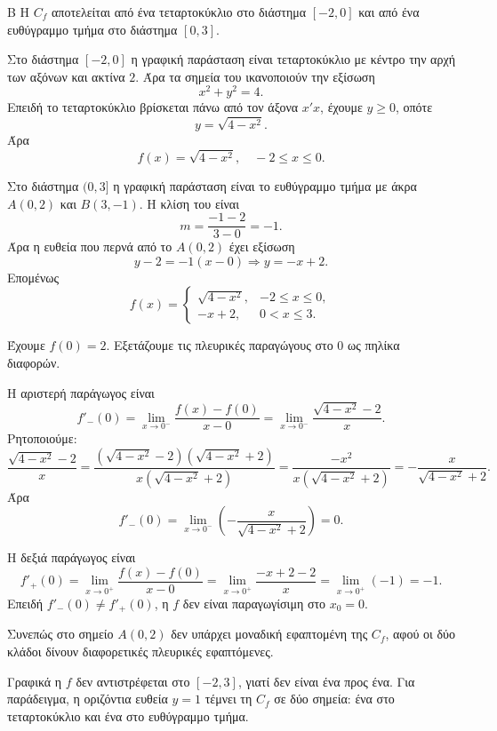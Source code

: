 

\begin{thema}{Β}
Η $C_f$ αποτελείται από ένα τεταρτοκύκλιο στο διάστημα $[-2,0]$ και από ένα ευθύγραμμο τμήμα στο διάστημα $[0,3]$.

\begin{erwthma}
\item Στο διάστημα $[-2,0]$ η γραφική παράσταση είναι τεταρτοκύκλιο με κέντρο την αρχή των αξόνων και ακτίνα $2$. Άρα τα σημεία του ικανοποιούν την εξίσωση
\[
x^2+y^2=4.
\]
Επειδή το τεταρτοκύκλιο βρίσκεται πάνω από τον άξονα $x'x$, έχουμε $y\geq 0$, οπότε
\[
y=\sqrt{4-x^2}.
\]
Άρα
\[
f(x)=\sqrt{4-x^2},\quad -2\leq x\leq 0.
\]

Στο διάστημα $(0,3]$ η γραφική παράσταση είναι το ευθύγραμμο τμήμα με άκρα $A(0,2)$ και $B(3,-1)$. Η κλίση του είναι
\[
m=\frac{-1-2}{3-0}=-1.
\]
Άρα η ευθεία που περνά από το $A(0,2)$ έχει εξίσωση
\[
y-2=-1(x-0)\Rightarrow y=-x+2.
\]
Επομένως
\[
f(x)=
\begin{cases}
\sqrt{4-x^2}, & -2\leq x\leq 0,\\
-x+2, & 0<x\leq 3.
\end{cases}
\]

\item Έχουμε $f(0)=2$. Εξετάζουμε τις πλευρικές παραγώγους στο $0$ ως πηλίκα διαφορών.

Η αριστερή παράγωγος είναι
\[
f'_-(0)=\lim_{x\to 0^-}\frac{f(x)-f(0)}{x-0}
=\lim_{x\to 0^-}\frac{\sqrt{4-x^2}-2}{x}.
\]
Ρητοποιούμε:
\[
\frac{\sqrt{4-x^2}-2}{x}
=\frac{(\sqrt{4-x^2}-2)(\sqrt{4-x^2}+2)}{x(\sqrt{4-x^2}+2)}
=\frac{-x^2}{x(\sqrt{4-x^2}+2)}
=-\frac{x}{\sqrt{4-x^2}+2}.
\]
Άρα
\[
f'_-(0)=\lim_{x\to 0^-}\left(-\frac{x}{\sqrt{4-x^2}+2}\right)=0.
\]

Η δεξιά παράγωγος είναι
\[
f'_+(0)=\lim_{x\to 0^+}\frac{f(x)-f(0)}{x-0}
=\lim_{x\to 0^+}\frac{-x+2-2}{x}
=\lim_{x\to 0^+}(-1)=-1.
\]
Επειδή $f'_-(0)\neq f'_+(0)$, η $f$ δεν είναι παραγωγίσιμη στο $x_0=0$.

Συνεπώς στο σημείο $A(0,2)$ δεν υπάρχει μοναδική εφαπτομένη της $C_f$, αφού οι δύο κλάδοι δίνουν διαφορετικές πλευρικές εφαπτόμενες.

\item Γραφικά η $f$ δεν αντιστρέφεται στο $[-2,3]$, γιατί δεν είναι ένα προς ένα. Για παράδειγμα, η οριζόντια ευθεία $y=1$ τέμνει τη $C_f$ σε δύο σημεία: ένα στο τεταρτοκύκλιο και ένα στο ευθύγραμμο τμήμα.


\end{erwthma}
\end{thema}
